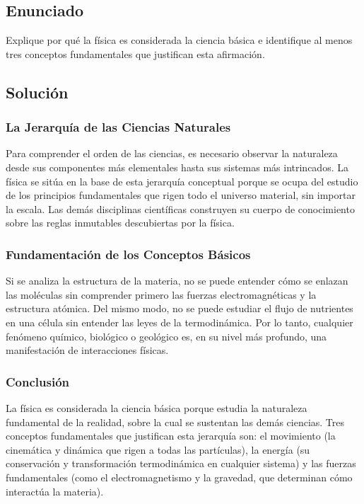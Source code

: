 \documentclass[12pt, a4paper]{article}
\begin{document}
\subsection*{Enunciado}
Explique por qué la física es considerada la ciencia básica e identifique al menos tres conceptos fundamentales que justifican esta afirmación.

\subsection*{Solución}

\subsubsection*{La Jerarquía de las Ciencias Naturales}
Para comprender el orden de las ciencias, es necesario observar la naturaleza desde sus componentes más elementales hasta sus sistemas más intrincados. La física se sitúa en la base de esta jerarquía conceptual porque se ocupa del estudio de los principios fundamentales que rigen todo el universo material, sin importar la escala. Las demás disciplinas científicas construyen su cuerpo de conocimiento sobre las reglas inmutables descubiertas por la física.

\subsubsection*{Fundamentación de los Conceptos Básicos}
Si se analiza la estructura de la materia, no se puede entender cómo se enlazan las moléculas sin comprender primero las fuerzas electromagnéticas y la estructura atómica. Del mismo modo, no se puede estudiar el flujo de nutrientes en una célula sin entender las leyes de la termodinámica. Por lo tanto, cualquier fenómeno químico, biológico o geológico es, en su nivel más profundo, una manifestación de interacciones físicas.

\subsubsection*{Conclusión}
La física es considerada la ciencia básica porque estudia la naturaleza fundamental de la realidad, sobre la cual se sustentan las demás ciencias. Tres conceptos fundamentales que justifican esta jerarquía son: el movimiento (la cinemática y dinámica que rigen a todas las partículas), la energía (su conservación y transformación termodinámica en cualquier sistema) y las fuerzas fundamentales (como el electromagnetismo y la gravedad, que determinan cómo interactúa la materia).
\end{document}
